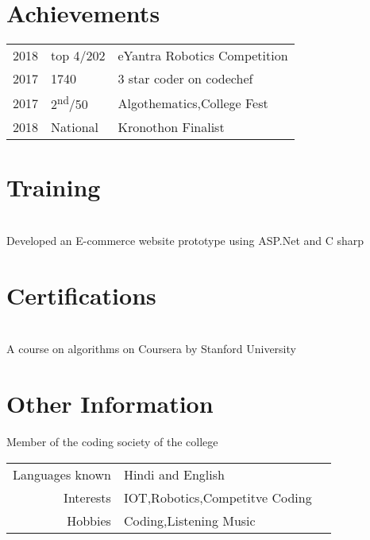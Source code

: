 \documentclass[]{resume-openfont}
\begin{document}
\begin{minipage}[t]{0.66\textwidth}

\section{Achievements} 
\begin{tabular}{rll}
2018	     & top 4/202  & eYantra Robotics Competition\\
2017	     & 1740  & 3 star coder on codechef\\
2017	     & 2\textsuperscript{nd}/50  & Algothematics,College Fest\\
2018	     & National  & Kronothon Finalist
\end{tabular}
\sectionsep
\section{Training }

\\
Developed an E-commerce website prototype using ASP.Net and C sharp
\sectionsep
\section{Certifications }
\\
A course on algorithms on Coursera by Stanford University
\sectionsep
\section{Other Information }
Member of the coding society of the college\\
\begin{tabular}{rll}
Languages known & Hindi and English\\
Interests & IOT,Robotics,Competitve Coding\\
Hobbies & Coding,Listening Music
\end{tabular}
\sectionsep
\end{minipage} 
\end{document}
